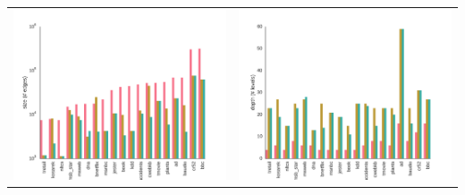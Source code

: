 \documentclass[final]{beamer}
\begin{document}
\begin{frame}{}
\begin{textblock}{25.2}
    \begin{table}[ht]
      \setlength{\tabcolsep}{30pt}  
      \centering
      \begin{tabular}{c c}
        \includegraphics[width=0.4\linewidth]{figures/edges-comp.pdf}&\includegraphics[width=0.4\linewidth]{figures/levels-comp.pdf}
      \end{tabular}
    \end{table}




\end{textblock}
\end{frame}
\end{document}
